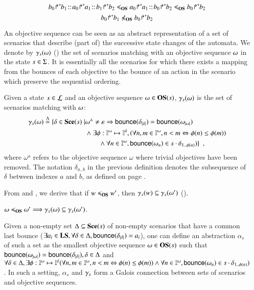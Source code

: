 \begin{example}
\[\obj{b_0}{b_1}\concat\obj{a_0}{a_1}\concat\obj{b_1}{b_2}
\ltw
\obj{a_0}{a_1}\concat\obj{b_0}{b_2}
\ltw
\obj{b_0}{b_2}\]
\[\obj{b_0}{b_1}\not\ltw\obj{b_0}{b_2}\]
\end{example}

An objective sequence can be seen as an abstract representation of a set of scenarios that describe
(part of) the successive state changes of the automata.
We denote by $\gamma_s(\omega)$ () the set of scenarios matching with an objective sequence
$\omega$ in the state $s\in\Sigma$.
It is essentially all the scenarios for which there exists a mapping from the bounces of each
objective to the bounce of an action in the scenario which preserve the sequential ordering.

\begin{definition}[$\concr: \OS \to \powerset(\Sce)$]\label{def:concr}
Given a state $s\in\mathcal{L}$ and an objective sequence
$\omega\in\mathbf{OS}(s)$, $\gamma_s(\omega)$ is the set of scenarios matching with $\omega$:
\begin{align*}
\gamma_s(\omega) \stackrel{\Delta}= \{ \delta\in\mathbf{Sce}(s)\mid &
\omega^\vartriangle\neq \varepsilon\Rightarrow
\mathsf{bounce}(\delta_{|\delta|}) = \mathsf{bounce}(\omega_{|\omega|})
\\ &
 \wedge \exists \phi:\mathbb{I}^{\omega}\mapsto\mathbb{I}^{\delta},
    (\forall n,m\in\mathbb{I}^{\omega}, n<m \Leftrightarrow \phi(n)\leq\phi(m))
\\ & \qquad
	\wedge \forall n\in\mathbb{I}^{\omega},
	  \mathsf{bounce}(\omega_n) \in s\cdot\delta_{1..\phi(n)})
\}
\enspace,
\end{align*}
where $\omega^\vartriangle$ refers to the objective sequence $\omega$ where
trivial objectives have been removed.
The notation $\delta_{a..b}$ in the previous definition
denotes the subsequence of $\delta$ between indexes $a$ and $b$,
as defined on page \pageref{notations}.
\end{definition}

From  and , we derive that if 
$w\preccurlyeq_{\mathbf{OS}} w'$, then $\gamma_s(w)\subseteq\gamma_s(\omega')$ ().
\begin{lemma}\label{lem:ltw}
$\omega\preccurlyeq_{\mathbf{OS}}\omega' \Longrightarrow \gamma_s(\omega)\subseteq\gamma_s(\omega')$\enspace.
\end{lemma}

Given a non-empty set $\Delta\subseteq\mathbf{Sce}(s)$ of non-empty scenarios that have a common last bounce
($\exists a_i\in\mathbf{LS}, \forall\delta\in\Delta,
\mathsf{bounce}(\delta_{|\delta|})=a_i$), one can define an abstraction $\alpha_s$ of
such a set as the smallest objective sequence $\omega\in\mathbf{OS}(s)$ such that
$\mathsf{bounce}(\omega_{|\omega|}) = \mathsf{bounce}(\delta_{|\delta|}), \delta\in\Delta$
and
$\forall\delta\in\Delta, \exists \phi:\mathbb{I}^{\omega}\mapsto\mathbb{I}^{\delta}
    (\forall n,m\in\mathbb{I}^{\omega}, n<m \Leftrightarrow \phi(n)\leq\phi(m))
	\wedge \forall n\in\mathbb{I}^{\omega},
	  \mathsf{bounce}(\omega_n) \in s\cdot\delta_{1..\phi(n)})$.
In such a setting, $\alpha_s$ and $\gamma_s$ form a Galois connection between sets
of scenarios and objective sequences.


